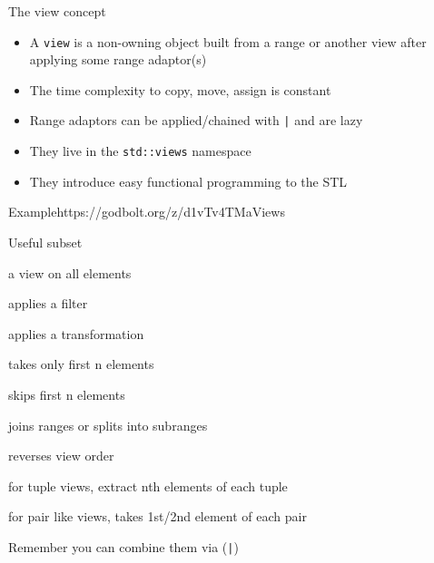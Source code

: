 \begin{frame}[fragile]
  \begin{block}{The view concept}
    \begin{itemize}
    \item A \texttt{view} is a non-owning object built from a range or another view after applying some range adaptor(s)
    \item The time complexity to copy, move, assign is constant
    \item Range adaptors can be applied/chained with \texttt{|} and are lazy
    \item They live in the \texttt{std::views} namespace
    \item They introduce easy functional programming to the STL
    \end{itemize}
  \end{block}
  \begin{exampleblockGB}{Example}{https://godbolt.org/z/d1vTv4TMa}{Views}
    { \small
    }
  \end{exampleblockGB}
\end{frame}

\begin{frame}[fragile]
  \begin{block}{Useful subset}
    \begin{description}
    \item[all] a view on all elements
    \item[filter] applies a filter
    \item[transform] applies a transformation
    \item[take] takes only first n elements
    \item[drop] skips first n elements
    \item[join/split] joins ranges or splits into subranges
    \item[reverse] reverses view order
    \item[elements] for tuple views, extract nth elements of each tuple
    \item[keys/values] for pair like views, takes 1st/2nd element of each pair
    \end{description}
  \end{block}
  Remember you can combine them via (\texttt{|})
\end{frame}

